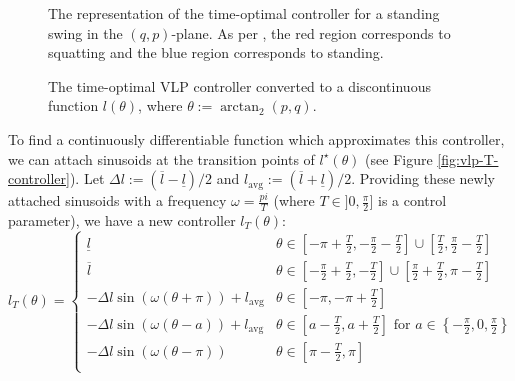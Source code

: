 \begin{figure}
   \centering
   
   \caption{The representation of the time-optimal controller for a standing
      swing in the \((q,p)\)-plane. As per 
      \cite{pumping_swing_standing_squatting}, the red region corresponds to
      squatting and the blue region corresponds to standing.}
      \label{fig:vlp-optimal-controller-qp-plane}
\end{figure}

\begin{figure}
   \centering
   
   \caption{The time-optimal VLP controller converted to a discontinuous
   function \(l(\theta)\), where \(\theta := \arctan_2(p,q)\).}\label{fig:vlp-optimal-controller}
\end{figure}

To find a continuously differentiable function which approximates this controller,
we can attach sinusoids at the transition points of
\(l^\star(\theta)\) (see Figure \ref{fig:vlp-T-controller}). Let
\(\Delta l := (\overline{l} - \underline{l})/2\) and 
\(l_{\text{avg}} := (\overline{l} + \underline{l})/2\).
Providing these newly attached sinusoids with a frequency \(\omega = \frac{pi}{T}\) 
(where \(T \in ]0,\frac{\pi}{2}]\) is a control parameter), we have a new
controller \(l_T(\theta)\):
\begin{equation}\label{eqn:vlp-T-controller}
   l_T(\theta) = \begin{cases}
      \underline{l} & \theta \in \left[-\pi + \frac{T}{2}, -\frac{\pi}{2} - \frac{T}{2}\right] 
      \cup \left[\frac{T}{2}, \frac{\pi}{2} - \frac{T}{2}\right] \\
      \overline{l} & \theta \in \left[-\frac{\pi}{2} + \frac{T}{2}, -\frac{T}{2}\right] 
      \cup \left[\frac{\pi}{2} + \frac{T}{2}, \pi - \frac{T}{2}\right] \\
      -\Delta l \sin(\omega(\theta + \pi)) + l_{\text{avg}} & \theta \in
      \left[-\pi,-\pi + \frac{T}{2}\right] \\
      -\Delta l \sin(\omega(\theta - a)) + l_\text{avg} & 
      \theta \in \left[a - \frac{T}{2}, a + \frac{T}{2}\right] \text{ for } 
      a \in \left\{-\frac{\pi}{2}, 0, \frac{\pi}{2}\right\} \\
      -\Delta l \sin(\omega(\theta-\pi)) & \theta \in \left[\pi - \frac{T}{2},\pi\right] \\
   \end{cases}
\end{equation}

